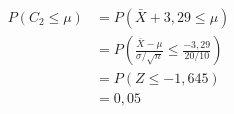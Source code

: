 \begin{questions}
\begin{parts}
    \begin{solution}
        \begin{align*}
            P(C_2\leq \mu)&=P(\bar{X}+3{,}29\leq \mu)\\
            &= P\left(\frac{\bar{X}-\mu}{\sigma/\sqrt{n}}\leq \frac{-3{,}29}{20/10}\right)\\
            &= P(Z\leq -1{,}645)\\
            &= 0{,}05
        \end{align*}
    \end{solution}


\end{parts}
\end{questions}
\pageblanche
 
